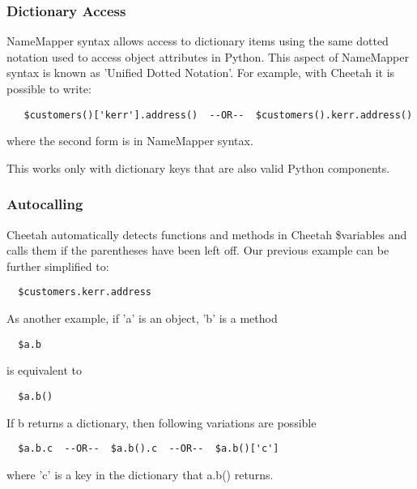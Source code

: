 \subsubsection{Dictionary Access}
\label{language.namemapper.dict}

NameMapper syntax allows access to dictionary items using the same dotted
notation used to access object attributes in Python.  This aspect of NameMapper
syntax is known as 'Unified Dotted Notation'.
For example, with Cheetah it is possible to write:
\begin{verbatim}
   $customers()['kerr'].address()  --OR--  $customers().kerr.address()
\end{verbatim}
where the second form is in NameMapper syntax.

This works only with dictionary keys that are also valid Python components.

\subsubsection{Autocalling}
\label{language.namemapper.autocalling}

Cheetah automatically detects functions and methods in Cheetah \$variables and
calls them if the parentheses have been left off.  Our previous example can be
further simplified to:
\begin{verbatim}
  $customers.kerr.address
\end{verbatim}

As another example, if 'a' is an object, 'b' is a method
\begin{verbatim}
  $a.b
\end{verbatim}

is equivalent to

\begin{verbatim}
  $a.b()
\end{verbatim}

If b returns a dictionary, then following variations are possible
\begin{verbatim}
  $a.b.c  --OR--  $a.b().c  --OR--  $a.b()['c']
\end{verbatim}
where 'c' is a key in the dictionary that a.b() returns.

